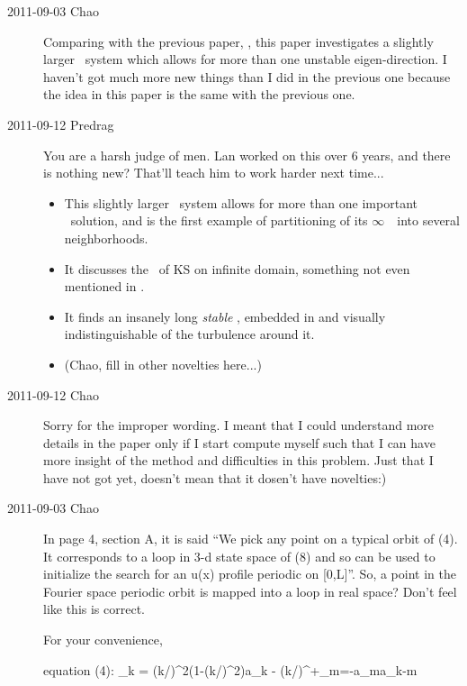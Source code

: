 \begin{description}

\item[2011-09-03 Chao]
Comparing with the previous paper, , this paper
investigates a slightly larger \KS\ system which allows for more than one unstable
eigen-direction. I haven't got much more new things than I did in the previous
one because the idea in this paper is the same with the previous one.

\item[2011-09-12 Predrag] You are a harsh judge of men. Lan worked on
this over 6 years, and there is nothing new? That'll teach him to work
harder next time...
                            \toCB

\begin{itemize}
    \item
This slightly larger \KS\ system allows for more than one important \eqv\
solution, and is the first example of partitioning of its $\infty$\dmn\
\statesp\ into several neighborhoods.
    \item
It discusses the \eqv\ of KS on infinite domain, something not even mentioned
in .
    \item
It finds an insanely long \emph{stable} \po, embedded in and visually
indistinguishable of the turbulence around it.
    \item
(Chao, fill in other novelties here...)
\end{itemize}

\item[2011-09-12 Chao]
Sorry for the improper wording. I meant that I could understand more
details in the paper only if I start compute myself such that I can have
more insight of the method and difficulties in this problem. Just that I
have not got yet, doesn't mean that it dosen't have novelties:)

\item[2011-09-03 Chao]

In page 4, section A, it is said ``We pick any point on a typical orbit
of (4). It corresponds to a loop in 3-d state space of (8) and so can be
used to initialize the search for an u(x) profile periodic on [0,L]''.
So, a point in the Fourier space periodic orbit is mapped into a loop in
real space? Don't feel like this is correct.

For your convenience,

equation (4):
\beq
\displaystyle{}_{k}
= (k/)^{2}(1-(k/)^{2})a_{k}
- (k/\tilde{L})\sum\nolimits^{+\infty}_{m=-\infty}a_{m}a_{k-m}
\ee{KSdiscr}


\end{description}
